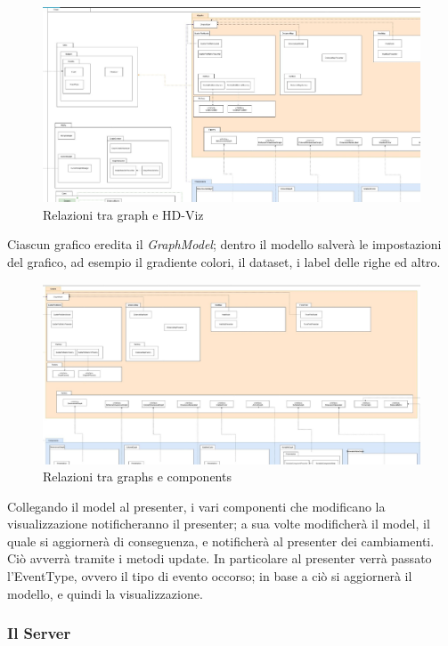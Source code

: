\documentclass[../manuale_sviluppatore.tex]{subfiles}
\begin{document}
\begin{figure}[H]
	\centering
	\includegraphics[width=18cm]{img/graph-e-hdviz.jpg}
	\caption{Relazioni tra graph e HD-Viz}
\end{figure}


Ciascun grafico eredita il \emph{GraphModel}; dentro il modello salverà le impostazioni del grafico, ad esempio il gradiente colori, il dataset, i label delle righe ed altro.

\begin{figure}[H]
	\centering
	\includegraphics[width=18cm]{img/graphs-e-components.jpg}
	\caption{Relazioni tra graphs e components}
\end{figure}


Collegando il model al presenter, i vari componenti che modificano la visualizzazione notificheranno il presenter; a sua volte modificherà il model, il quale si aggiornerà di conseguenza, 
e notificherà al presenter dei cambiamenti.
Ciò avverrà tramite i metodi update. In particolare al presenter verrà passato l'EventType, ovvero il tipo di evento occorso; in base a ciò si aggiornerà il modello, e quindi la visualizzazione.

\subsubsection{Il Server}
\end{document}
